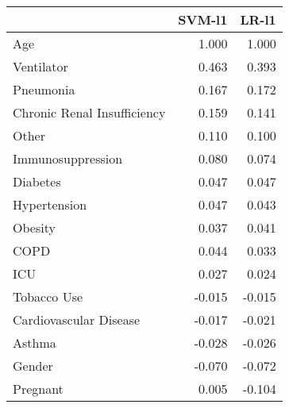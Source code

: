 \begin{tabular}{lrr}
\toprule
{} &  SVM-l1 &  LR-l1 \\
\midrule
Age                         &   1.000 &  1.000 \\
Ventilator                  &   0.463 &  0.393 \\
Pneumonia                   &   0.167 &  0.172 \\
Chronic Renal Insufficiency &   0.159 &  0.141 \\
Other                       &   0.110 &  0.100 \\
Immunosuppression           &   0.080 &  0.074 \\
Diabetes                    &   0.047 &  0.047 \\
Hypertension                &   0.047 &  0.043 \\
Obesity                     &   0.037 &  0.041 \\
COPD                        &   0.044 &  0.033 \\
ICU                         &   0.027 &  0.024 \\
Tobacco Use                 &  -0.015 & -0.015 \\
Cardiovascular Disease      &  -0.017 & -0.021 \\
Asthma                      &  -0.028 & -0.026 \\
Gender                      &  -0.070 & -0.072 \\
Pregnant                    &   0.005 & -0.104 \\
\bottomrule
\end{tabular}
